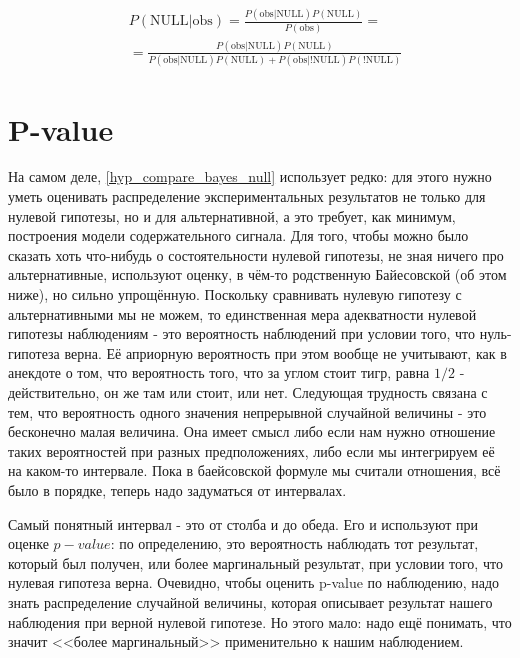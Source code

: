\documentclass{book}
\begin{document}
\begin{align}\label{hyp_compare_bayes_null}
   &P\left(\text{NULL|obs}\right)=
   \frac{P\left(\text{obs|NULL}\right) P\left(\text{NULL}\right)}{P\left(\text{obs}\right)} = \nonumber \\
   &=\frac{P\left(\text{obs|NULL}\right) P\left(\text{NULL}\right)}{P\left(\text{obs|NULL}\right) P\left(\text{NULL}\right)+P\left(\text{obs|!NULL}\right) P\left(\text{!NULL}\right)} 
\end{align}

\section*{P-value}
На самом деле, \eqref{hyp_compare_bayes_null} использует редко: для этого нужно уметь оценивать распределение экспериментальных результатов не только для нулевой гипотезы, но и для альтернативной, а это требует, как минимум, построения модели содержательного сигнала. Для того, чтобы можно было сказать хоть что-нибудь о состоятельности нулевой гипотезы, не зная ничего про альтернативные, используют оценку, в чём-то родственную Байесовской (об этом ниже), но сильно упрощённую. Поскольку сравнивать нулевую гипотезу с альтернативными мы не можем, то единственная мера адекватности нулевой гипотезы наблюдениям - это вероятность наблюдений при условии того, что нуль-гипотеза верна. Её априорную вероятность при этом вообще не учитывают, как в анекдоте о том, что вероятность того, что за углом стоит тигр, равна $1/2$ - действительно, он же там или стоит, или нет. 
Следующая трудность связана с тем, что вероятность одного значения непрерывной случайной величины - это бесконечно малая величина. Она имеет смысл либо если нам нужно отношение таких вероятностей при разных предположениях, либо если мы интегрируем её на каком-то интервале. Пока в баейсовской формуле мы считали отношения, всё было в порядке, теперь надо задуматься от интервалах.

Самый понятный интервал - это от столба и до обеда. Его и используют при оценке $p-value$: по определению, это вероятность наблюдать тот результат, который был получен, или более маргинальный результат, при условии того, что нулевая гипотеза верна. Очевидно, чтобы оценить p-value по наблюдению, надо знать распределение случайной величины, которая описывает результат нашего наблюдения при верной нулевой гипотезе. Но этого мало: надо ещё понимать, что значит <<более маргинальный>> применительно к нашим наблюдением. 
\end{document}
